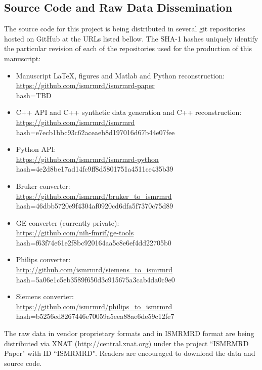 \documentclass[12pt]{article}
\begin{document}
\subsection*{Source Code and Raw Data Dissemination}
The source code for this project is being distributed in several git repositories hosted on GitHub at the URLs listed bellow.  The SHA-1 hashes uniquely identify the particular revision of each of the repositories used for the production of this manuscript:
\begin{itemize}
\item Manuscript LaTeX, figures and Matlab and Python reconstruction: \\
	\url{https://github.com/ismrmrd/ismrmrd-paper} \\
	hash=TBD
\item C++ API and C++ synthetic data generation and C++ reconstruction: \\
	\url{https://github.com/ismrmrd/ismrmrd} \\
    	hash=e7ecb1bbc93c62aceaeb8d197016d67b44e07fee
\item Python API: \\
	\url{https://github.com/ismrmrd/ismrmrd-python} \\
	hash=4e2d8be17ad14fc9ff8d5801751a4511ce435b39
\item Bruker converter: \\
	\url{https://github.com/ismrmrd/bruker_to_ismrmrd}\\
	hash=46dbb5720e9f4304af0920cd6dfa5f7370c75d89
\item GE converter (currently private):\\
	 \url{https://github.com/nih-fmrif/ge-tools} \\
	 hash=f63f74e61e2f8bc920164aa5c8e6ef4dd22705b0
\item Philips converter:\\
	 \url{http://github.com/ismrmrd/siemens_to_ismrmrd}\\
	 hash=5a06e1c5eb3589f650d3c915675a3cab4da0c9e0
\item Siemens converter: \\
	\url{https://github.com/ismrmrd/philips_to_ismrmrd}\\
	hash=b5256ed8267446e70059a5eea88ae6de59c12fe7
\end{itemize}
The raw data in vendor proprietary formats and in ISMRMRD format are being distributed via XNAT (http://central.xnat.org) under the project ``ISMRMRD Paper" with ID ``ISMRMRD".  Readers are encouraged to download the data and source code.
\end{document}

